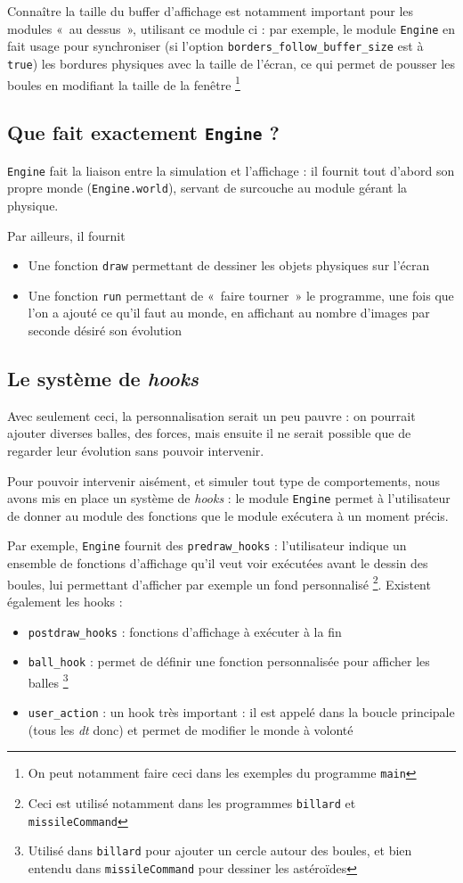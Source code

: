 \documentclass[a4paper]{scrartcl}
\begin{document}
Connaître la taille du buffer d'affichage est notamment important pour
les modules «~au dessus~», utilisant ce module ci : par exemple, le
module \texttt{Engine} en fait usage pour synchroniser (si l'option
\texttt{borders\_follow\_buffer\_size} est à \texttt{true}) les bordures
physiques avec la taille de l'écran, ce qui permet de pousser les
boules en modifiant la taille de la fenêtre \footnote{On peut
  notamment faire ceci dans les exemples du programme \texttt{main}}

\subsection{Que fait exactement \texttt{Engine} ?}
\texttt{Engine} fait la liaison entre la simulation et l'affichage :
il fournit tout d'abord son propre monde (\texttt{Engine.world}),
servant de surcouche au module gérant la physique.

Par ailleurs, il fournit 
\begin{itemize}
\item Une fonction \texttt{draw} permettant de dessiner les objets
  physiques sur l'écran
\item Une fonction \texttt{run} permettant de «~faire tourner~» le
  programme, une fois que l'on a ajouté ce qu'il faut au monde, en
  affichant au nombre d'images par seconde désiré son évolution
\end{itemize}

\subsection{Le système de \emph{hooks}}
Avec seulement ceci, la personnalisation serait un peu pauvre : on
pourrait ajouter diverses balles, des forces, mais ensuite il ne
serait possible que de regarder leur évolution sans pouvoir
intervenir.

Pour pouvoir intervenir aisément, et simuler tout type de
comportements, nous avons mis en place un système de \emph{hooks} : le
module \texttt{Engine} permet à l'utilisateur de donner au module des
fonctions que le module exécutera à un moment précis.

Par exemple, \texttt{Engine} fournit des \texttt{predraw\_hooks} :
l'utilisateur indique un ensemble de fonctions d'affichage qu'il veut
voir exécutées avant le dessin des boules, lui permettant d'afficher
par exemple un fond personnalisé \footnote{Ceci est utilisé notamment
  dans les programmes \texttt{billard} et \texttt{missileCommand}}.
Existent également les hooks :
\begin{itemize}
\item \texttt{postdraw\_hooks} : fonctions d'affichage à exécuter à la fin
\item \texttt{ball\_hook} : permet de définir une fonction
  personnalisée pour afficher les balles \footnote{Utilisé dans
    \texttt{billard} pour ajouter un cercle autour des boules, et bien
    entendu dans \texttt{missileCommand} pour dessiner les astéroïdes}
\item \texttt{user\_action} : un hook très important : il est appelé
  dans la boucle principale (tous les \emph{dt} donc) et permet de
  modifier le monde à volonté
\end{itemize}
\end{document}
